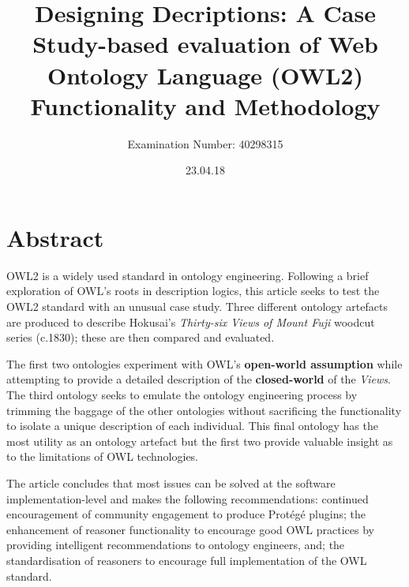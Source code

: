 \documentclass[titlepage,a4paper,12pt,oneside]{book}
\title{\textbf{Designing Decriptions: A Case Study-based evaluation of Web Ontology Language (OWL2) Functionality and Methodology}}
\author{Examination Number: 40298315}
\affil{School of Computing}
\affil{Edinburgh Napier}
\date{23.04.18}
\begin{document}
\maketitle

\chapter*{Abstract}
OWL2 is a widely used standard in ontology engineering.
Following a brief exploration of OWL's roots in description logics, this article seeks to test the OWL2 standard with an unusual case study.
Three different ontology artefacts are produced to describe Hokusai's \textit{Thirty-six Views of Mount Fuji} woodcut series (c.1830); these are then compared and evaluated.\par
The first two ontologies experiment with OWL's \textbf{open-world assumption} while attempting to provide a detailed description of the \textbf{closed-world} of the \textit{Views}.
The third ontology seeks to emulate the ontology engineering process by trimming the baggage of the other ontologies without sacrificing the functionality to isolate a unique description of each individual.
This final ontology has the most utility as an ontology artefact but the first two provide valuable insight as to the limitations of OWL technologies.\par
The article concludes that most issues can be solved at the software implementation-level and makes the following recommendations: continued encouragement of community engagement to produce Protégé plugins; the enhancement of reasoner functionality to encourage good OWL practices by providing intelligent recommendations to ontology engineers, and; the standardisation of reasoners to encourage full implementation of the OWL standard.

\tableofcontents
\end{document}
